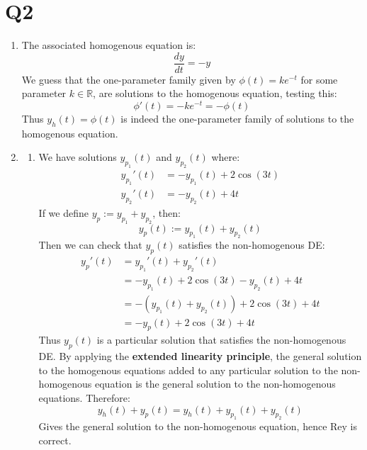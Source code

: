 \documentclass[a4paper, 11pt]{article}
\newcommand{\RR}{\mathbb{R}}
\begin{document}
\section*{Q2}
\begin{enumerate}[label=(\alph*)]
  \item The associated homogenous equation is: 
  $$
    \frac{dy}{dt}=-y
  $$
  We guess that the one-parameter family given by $\phi(t)=ke^{-t}$ for some parameter $k\in\RR$, are solutions to the homogenous equation, testing this: 
  $$\phi'(t)=-ke^{-t}=-\phi(t)$$ 
  Thus $y_h(t)=\phi(t)$ is indeed the one-parameter family of solutions to the homogenous equation. 

  \item 
  \begin{enumerate}[label=(\roman*)]
    \item We have solutions $y_{p_1}(t)$ and $y_{p_2}(t)$ where:
    \begin{align*}
      y_{p_1}'(t)&=-y_{p_1}(t)+2\cos(3t)\\
      y_{p_2}'(t)&=-y_{p_2}(t)+4t
    \end{align*}
    If we define $y_p:=y_{p_1}+y_{p_2}$, then: 
    $$y_p(t):=y_{p_1}(t)+y_{p_2}(t)$$
    Then we can check that $y_p(t)$ satisfies the non-homogenous DE: 
    \begin{align*}
      y_p'(t)&=y_{p_1}'(t)+y_{p_2}'(t)\\
      &=-y_{p_1}(t)+2\cos(3t)-y_{p_2}(t)+4t\\
      &=-(y_{p_1}(t)+y_{p_2}(t))+2\cos(3t)+4t\\
      &=-y_p(t)+2\cos(3t)+4t
    \end{align*}
    Thus $y_p(t)$ is a particular solution that satisfies the non-homogenous DE. By applying the \textbf{extended linearity principle}, the general solution to the homogenous equations added to any particular solution to the non-homogenous equation is the general solution to the non-homogenous equations. Therefore:
    $$y_h(t)+y_p(t)=y_h(t)+y_{p_1}(t)+y_{p_2}(t)$$
    Gives the general solution to the non-homogenous equation, hence Rey is correct. 


\end{enumerate}
\end{enumerate}
\end{document}
